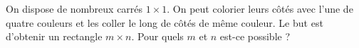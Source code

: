 On dispose de nombreux carrés $1 \times 1$. On peut colorier leurs côtés avec l'une de quatre couleurs et les coller le long de côtés de même couleur. Le but est d'obtenir un rectangle $m \times n$. Pour quels $m$ et $n$ est-ce possible ?

